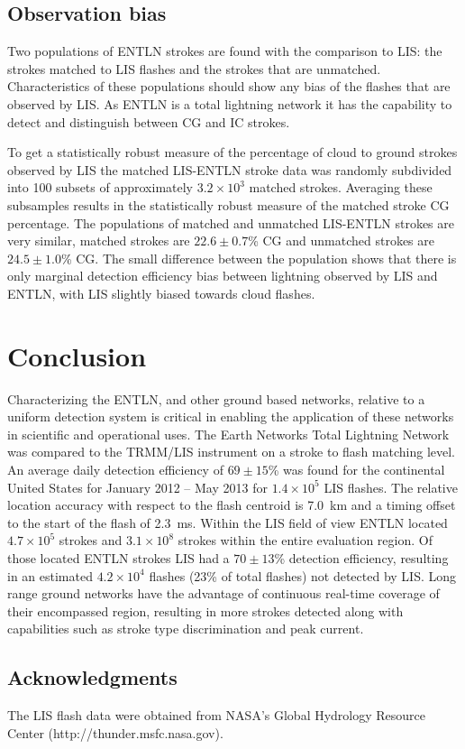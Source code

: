 \subsection{Observation bias}

Two populations of ENTLN strokes are found with the comparison to LIS: the strokes matched to LIS flashes and the strokes that are unmatched.
Characteristics of these populations should show any bias of the flashes that are observed by LIS.
As ENTLN is a total lightning network it has the capability to detect and distinguish between CG and IC strokes.

To get a statistically robust measure of the percentage of cloud to ground strokes observed by LIS the matched LIS-ENTLN stroke data was randomly subdivided into 100 subsets of approximately $3.2\times10^3$ matched strokes.
Averaging these subsamples results in the statistically robust measure of the matched stroke CG percentage.
The populations of matched and unmatched LIS-ENTLN strokes are very similar, matched strokes are $22.6\pm0.7$\% CG and unmatched strokes are $24.5\pm1.0$\% CG.
The small difference between the population shows that there is only marginal detection efficiency bias between lightning observed by LIS and ENTLN, with LIS slightly biased towards cloud flashes.

\section{Conclusion}

Characterizing the ENTLN, and other ground based networks, relative to a uniform detection system is critical in enabling the application of these networks in scientific and operational uses.
The Earth Networks Total Lightning Network was compared to the TRMM/LIS instrument on a stroke to flash matching level.
An average daily detection efficiency of $69\pm 15$\% was found for the continental United States for January 2012 -- May 2013 for $1.4 \times 10^5$ LIS flashes.
The relative location accuracy with respect to the flash centroid is 7.0~km and a timing offset to the start of the flash of 2.3~ms.
Within the LIS field of view ENTLN located $4.7\times 10^5$ strokes and $3.1\times10^8$ strokes within the entire evaluation region.
Of those located ENTLN strokes LIS had a $70 \pm 13$\% detection efficiency, resulting in an estimated $4.2 \times 10^4$ flashes (23\% of total flashes) not detected by LIS.
Long range ground networks have the advantage of continuous real-time coverage of their encompassed region, resulting in more strokes detected along with capabilities such as stroke type discrimination and peak current.

\subsection*{Acknowledgments}

The LIS flash data were obtained from NASA's Global Hydrology Resource Center (http://thunder.msfc.nasa.gov).
